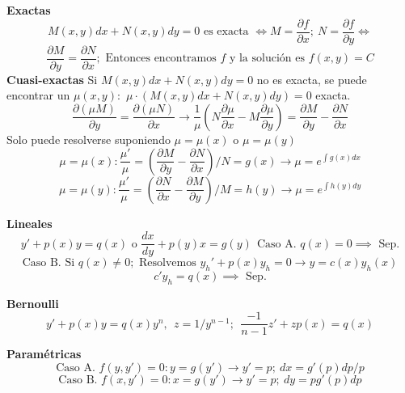 \documentclass[10pt,landscape,letterpaper]{article}
\begin{document}
\begin{multicols}{3}
\textbf{Exactas}
\vspace{-6pt}
\[M(x,y)dx+N(x,y)dy=0 \mbox{ es exacta } \iff M=\frac{\partial f}{\partial x}; \ N=\frac{\partial f}{\partial y} \iff \]
\vspace{-10pt}
\[\frac{\partial M}{\partial y} = \frac{\partial N}{\partial x}; \mbox{ Entonces encontramos } f \mbox{ y la solución es } f(x,y)=C\]%
\textbf{Cuasi-exactas}
Si $M(x,y)dx+N(x,y)dy=0$ no es exacta, se puede encontrar un $\mu(x,y):$
$\mu \cdot \left(M(x,y)dx+N(x,y)dy\right)=0$ exacta.
\[\frac{\partial(\mu M)}{\partial y}=\frac{\partial(\mu N)}{\partial x}\rightarrow \frac{1}{\mu}\left(N\frac{\partial \mu}{\partial x}-M\frac{\partial \mu}{\partial y}\right)=\frac{\partial M}{\partial y}-\frac{\partial N}{\partial x}\]
Solo puede resolverse suponiendo $\mu = \mu(x) \mbox{ o } \mu=\mu(y)$
\[\mu = \mu(x): \frac{\mu'}{\mu}=\left(\frac{\partial M}{\partial y}-\frac{\partial N}{\partial x}\right)/N=g(x) \rightarrow \mu=e^{\int{g(x)dx}}\]
\vspace{-7pt}
\[\mu = \mu(y): \frac{\mu'}{\mu}=\left(\frac{\partial N}{\partial x}-\frac{\partial M}{\partial y}\right)/M=h(y) \rightarrow \mu=e^{\int{h(y)dy}}\]
\vspace{-10pt}

\textbf{Lineales}
\vspace{-8pt}
\[y'+p(x)y=q(x) \mbox{ o } \frac{dx}{dy} + p(y)x=g(y) \ \ \boxed{\mbox{Caso A. } q(x)=0 \implies \mbox{ Sep.}}\]
\vspace{-5pt}
\[\mbox{Caso B. Si } q(x) \neq 0; \mbox{ Resolvemos } y_h'+p(x)y_h=0 \rightarrow y=c(x)y_h(x)\]
\[ c'y_h = q(x) \implies \mbox{ Sep.}\]
\vspace{-18pt}

\textbf{Bernoulli}
\vspace{-5pt}
\[y'+p(x)y=q(x)y^n, \ \ z = 1/y^{n-1}; \ \ \frac{-1}{n-1} z' + zp(x)=q(x)\]
\vspace{-9pt}

\textbf{Paramétricas}
\vspace{-3pt}
\[\mbox{Caso A. } f(y,y')=0 : y=g(y') \rightarrow y'=p; \ \boxed{dx =  g'(p) dp/p}\]
\vspace{-7pt}
\[\mbox{Caso B. } f(x,y')=0 : x=g(y') \rightarrow y'=p;  \ \boxed{dy = p g'(p)dp}\]
\vspace{-10pt}


\end{multicols}
\end{document}
